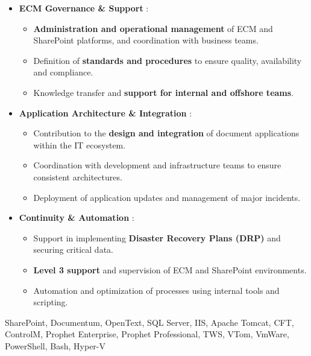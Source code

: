 \begin{experiences}
{\begin{itemize}[left=0pt,label={},itemsep=0.4em]
          \item \textbf{ECM Governance \& Support} :
            \begin{itemize}[itemsep=0.15em,topsep=0.1em,parsep=0pt]
              \small
              \item \textbf{Administration and operational management} of ECM and SharePoint platforms, and coordination with business teams.
              \item Definition of \textbf{standards and procedures} to ensure quality, availability and compliance.
              \item Knowledge transfer and \textbf{support for internal and offshore teams}.
            \end{itemize}

        \vspace{0.3em}

          \item \textbf{Application Architecture \& Integration} :
            \begin{itemize}[itemsep=0.15em,topsep=0.1em,parsep=0pt]
              \small
              \item Contribution to the \textbf{design and integration} of document applications within the IT ecosystem.
              \item Coordination with development and infrastructure teams to ensure consistent architectures.
              \item Deployment of application updates and management of major incidents.
            \end{itemize}

        \vspace{0.3em}

          \item \textbf{Continuity \& Automation} :
            \begin{itemize}[itemsep=0.15em,topsep=0.1em,parsep=0pt]
              \small
              \item Support in implementing \textbf{Disaster Recovery Plans (DRP)} and securing critical data.
              \item \textbf{Level 3 support} and supervision of ECM and SharePoint environments.
              \item Automation and optimization of processes using internal tools and scripting.
            \end{itemize}

        \end{itemize}
        \vspace{0.3em}
    }
    {SharePoint, Documentum, OpenText, SQL Server, IIS, Apache Tomcat, CFT, ControlM, Prophet Enterprise, Prophet Professional, TWS, VTom, VmWare, PowerShell, Bash, Hyper-V}


\end{experiences}
